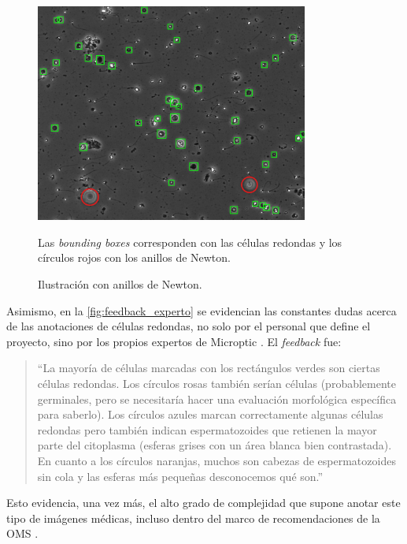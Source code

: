 \documentclass[12pt,a4paper,onecolumn,oneside]{report}
\begin{document}
\begin{figure}[H]
  \centering
  \includegraphics[width=0.8\textwidth]{figuras/rounds_cells/Anillos de Newton.png}
  \caption{Ilustración con anillos de Newton.}
  \label{fig:Anillos_Newton}
  Las \textit{bounding boxes} corresponden con las células redondas y los círculos rojos con los anillos de Newton.
\end{figure}

Asimismo, en la \autoref{fig:feedback_experto} se evidencian las constantes dudas acerca de las anotaciones de células redondas, no solo por el personal que define el proyecto, sino por los propios expertos de Microptic \cite{microptic}. 
El \textit{feedback} fue:

\begin{quote}
“La mayoría de células marcadas con los rectángulos verdes son ciertas células redondas. Los círculos rosas también serían células (probablemente germinales, pero se necesitaría hacer una evaluación morfológica específica para saberlo). Los círculos azules marcan correctamente algunas células redondas pero también indican espermatozoides que retienen la mayor parte del citoplasma (esferas grises con un área blanca bien contrastada). En cuanto a los círculos naranjas, muchos son cabezas de espermatozoides sin cola y las esferas más pequeñas desconocemos qué son.”
\end{quote}

Esto evidencia, una vez más, el alto grado de complejidad que supone anotar este tipo de imágenes médicas, incluso dentro del marco de recomendaciones de la OMS \cite{OMS} \cite{BJBS}.
\end{document}
